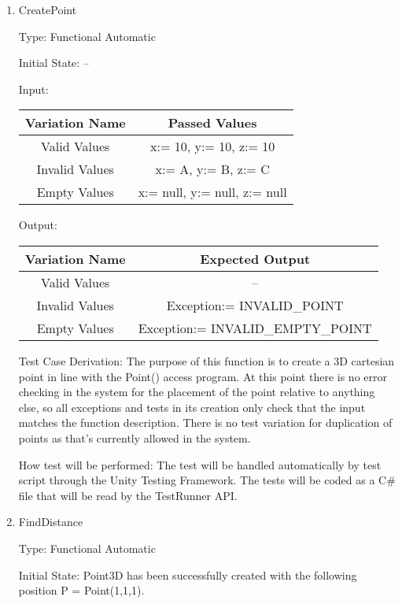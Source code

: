 \documentclass[12pt, titlepage]{article}
\begin{document}
\begin{enumerate}

\item{CreatePoint\\}

Type: Functional Automatic
					
Initial State: --
					
Input: 
\begin{tabular}{|c|c|}
	\hline
	\textbf{Variation Name} & \textbf{Passed Values}\\
	\hline
	Valid Values & x:= 10, y:= 10, z:= 10 \\
	Invalid Values & x:= A, y:= B, z:= C \\
	Empty Values & x:= null, y:= null, z:= null\\ 
	\hline
\end{tabular}
					
Output: 
\begin{tabular}{|c|c|}
	\hline
	\textbf{Variation Name} & \textbf{Expected Output}\\
	\hline
	Valid Values & -- \\
	Invalid Values & Exception:= INVALID\_POINT\\
	Empty Values & Exception:= INVALID\_EMPTY\_POINT\\
	\hline
\end{tabular}

Test Case Derivation: The purpose of this function is to create a 3D cartesian 
point in line with the Point() access program. At this point there is no error 
checking in the system for the placement of the point relative to anything 
else, so all exceptions and tests in its creation only check that the input 
matches the function description. There is no test variation for duplication of 
points as that's currently allowed in the system.

How test will be performed: The test will be handled automatically by test 
script through the Unity Testing Framework. The tests will be coded as a C\# 
file that will be read by the TestRunner API.
					
\item{FindDistance\\}

Type: Functional Automatic
					
Initial State: Point3D has been successfully created with the following 
position P = Point(1,1,1).
					

\end{enumerate}
\end{document}
